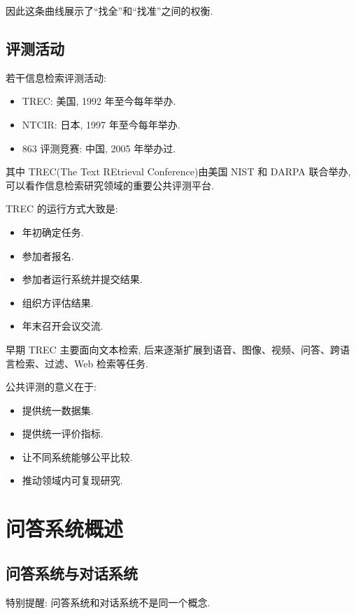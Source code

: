 因此这条曲线展示了“找全”和“找准”之间的权衡.

\subsection{评测活动}


若干信息检索评测活动:

\begin{itemize}
\item TREC: 美国, 1992 年至今每年举办.
\item NTCIR: 日本, 1997 年至今每年举办.
\item 863 评测竞赛: 中国, 2005 年举办过.
\end{itemize}

其中 TREC(The Text REtrieval Conference)由美国 NIST 和 DARPA 联合举办,
可以看作信息检索研究领域的重要公共评测平台.

TREC 的运行方式大致是:

\begin{itemize}
\item 年初确定任务.
\item 参加者报名.
\item 参加者运行系统并提交结果.
\item 组织方评估结果.
\item 年末召开会议交流.
\end{itemize}

早期 TREC 主要面向文本检索,
后来逐渐扩展到语音、图像、视频、问答、跨语言检索、过滤、Web 检索等任务.

公共评测的意义在于:

\begin{itemize}
\item 提供统一数据集.
\item 提供统一评价指标.
\item 让不同系统能够公平比较.
\item 推动领域内可复现研究.
\end{itemize}

\section{问答系统概述}


\subsection{问答系统与对话系统}


特别提醒: 问答系统和对话系统不是同一个概念.

